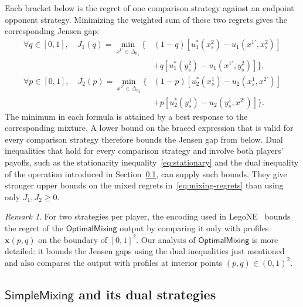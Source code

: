 \documentclass[11pt]{article}
\theoremstyle{remark}
\newtheorem*{remark}{Remark}
\theoremstyle{plain}
\newcommand{\sm}{\mathsf{SimpleMixing}}
\newcommand{\om}{\mathsf{OptimalMixing}}
\begin{document}
Each bracket below is the regret of one comparison strategy against
an endpoint opponent strategy. Minimizing the weighted sum of these
two regrets gives the corresponding Jensen gap:
\begin{equation}
 \begin{aligned}
  \forall q\in[0,1],\quad
  J_1(q)=\min_{x^{1\prime}\in\Delta_{n_1}}\bigl\{
   &(1-q)[u_1^*(x_s^2)-u_1(x^{1\prime},x_s^2)]\\
   &+q[u_1^*(y_s^2)-u_1(x^{1\prime},y_s^2)]\bigr\},\\
  \forall p\in[0,1],\quad
  J_2(p)=\min_{x^{2\prime}\in\Delta_{n_2}}\bigl\{
   &(1-p)[u_2^*(x_s^1)-u_2(x_s^1,x^{2\prime})]\\
   &+p[u_2^*(y_s^1)-u_2(y_s^1,x^{2\prime})]\bigr\}.
 \end{aligned}
 \label{eq:mixing-gap-losses}
\end{equation}
The minimum in each formula is attained by a best response to the
corresponding mixture. A lower bound on the braced expression that is
valid for every comparison strategy therefore bounds the Jensen gap
from below. Dual inequalities that hold for every comparison strategy
and involve both players' payoffs, such as the stationarity
inequality~\eqref{eq:stationary} and the dual inequality of the
operation introduced in Section~\ref{sec:simplemixing}, can supply such
bounds. They give stronger upper bounds on the mixed regrets
in~\eqref{eq:mixing-regrets} than using only $J_1,J_2\ge0$.

\begin{remark}
For two strategies per player, the encoding used in
LegoNE~\cite{legone2026} bounds the regret of the $\om$ output by
comparing it only with profiles $\boldsymbol x(p,q)$ on the
boundary of $[0,1]^2$. Our analysis of $\om$ is more detailed:
it bounds the Jensen gaps using the dual inequalities just mentioned
and also compares the output with profiles at interior points
$(p,q)\in(0,1)^2$.
\end{remark}

\subsection{\texorpdfstring{$\sm$}{SimpleMixing} and its dual strategies}
\label{sec:simplemixing}
\end{document}

